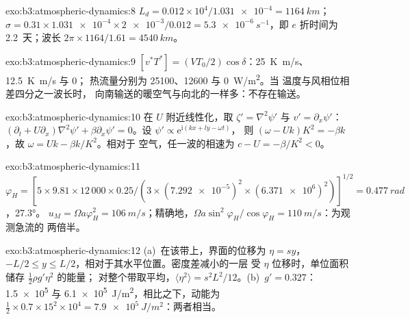 \begin{solution}{exo:b3:atmospheric-dynamics:8}
$L_d = 0.012\times10^4/\num{1.031e-4} = \qty{1164}{km}$；$\sigma =
0.31\times\num{1.031e-4}\times\num{2e-3}/0.012 = \qty{5.3e-6}{s^{-1}}$，即
$e$ 折时间为 \num{2.2}~天；波长 $2\pi\times1164/1.61 =
\qty{4540}{km}$。
\end{solution}

\begin{solution}{exo:b3:atmospheric-dynamics:9}
$[v^*T^*] = (VT_0/2)\cos\delta$：\qty{25}{K.m/s}、\qty{12.5}{K.m/s} 与 0；
热流量分别为 \num{25100}、\num{12600} 与 \qty{0}{W/m^2}。当
温度与风相位相差四分之一波长时，
向南输送的暖空气与向北的一样多：不存在输送。
\end{solution}

\begin{solution}{exo:b3:atmospheric-dynamics:10}
在 $U$ 附近线性化，取 $\zeta' = \nabla^2\psi'$ 与 $v' =
\partial_x\psi'$：$(\partial_t + U\partial_x)\nabla^2\psi' + \beta\partial_x
\psi' = 0$。设 $\psi' \propto \mathrm e^{\mathrm i(kx + ly - \omega t)}$，
则 $(\omega - Uk)K^2 = -\beta k$，故 $\omega = Uk - \beta k/K^2$。相对于
空气，任一波的相速为 $c - U = -\beta/K^2 < 0$。
\end{solution}

\begin{solution}{exo:b3:atmospheric-dynamics:11}
$\varphi_H = [5\times9.81\times12\,000\times0.25/(3\times(\num{7.292e-5})^2
\times(\num{6.371e6})^2)]^{1/2} = \qty{0.477}{rad}$，\ang{27.3}。
$u_M = \Omega a\varphi_H^2 = \qty{106}{m/s}$；精确地，$\Omega a\sin^2
\varphi_H/\cos\varphi_H = \qty{110}{m/s}$：为观测急流的
两倍半。
\end{solution}

\begin{solution}{exo:b3:atmospheric-dynamics:12}
(a)~在该带上，界面的位移为 $\eta = sy$，$-L/2 \le y
\le L/2$，相对于其水平位置。密度差减小的一层
受 $\eta$ 位移时，单位面积储存 $\tfrac12\rho g'\eta^2$ 的能量；
对整个带取平均，$\langle\eta^2\rangle = s^2L^2/12$。(b)~$g' = 0.327$：
\num{1.5e5} 与 \qty{6.1e5}{J/m^2}，相比之下，动能为 $\tfrac12\times0.7\times15^2
\times10^4 = \qty{7.9e5}{J/m^2}$：两者相当。
\end{solution}

